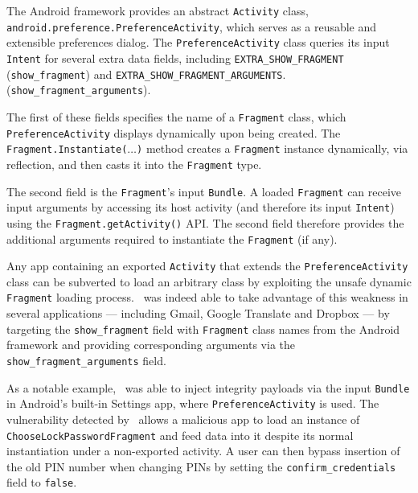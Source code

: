 The Android framework provides an abstract {\tt Activity} class,\texttt{
android.preference.PreferenceActivity}, which serves as a reusable and extensible preferences dialog. 
The {\tt PreferenceActivity} class queries its input {\tt Intent} for several extra data fields, including \texttt{EXTRA\_SHOW\_FRAGMENT}
(\texttt{show\_fragment}) 
and \texttt{EXTRA\_SHOW\_FRAGMENT\_ARGUMENTS}.
(\texttt{show\_fragment\_arguments}).

The first of these fields specifies the name 
of a \texttt{Fragment} class, which \texttt{PreferenceActivity}
displays dynamically upon being created. The {\tt Fragment.Instantiate($\ldots$)} method creates a {\tt Fragment} instance dynamically, via reflection, and then
casts it into the {\tt Fragment} type.

The second field is the \texttt{Fragment}'s input {\tt Bundle}. A loaded \texttt{Fragment} can
receive input arguments by accessing its host activity (and therefore
its input \texttt{Intent}) using the \texttt{Fragment.getActivity()} API. The second field therefore provides the additional arguments required to instantiate the {\tt Fragment} (if any).

Any app containing an exported {\tt Activity} that extends the {\tt PreferenceActivity} class can be subverted to load an arbitrary class
by exploiting the unsafe dynamic {\tt Fragment} loading process. \Tool\ was indeed able to take advantage of this weakness
in several applications --- including Gmail, Google Translate and Dropbox --- by
targeting the \texttt{show\_fragment}  field with {\tt Fragment} class names from the Android framework and providing corresponding arguments via the \texttt{show\_fragment\_arguments} field. 


As a notable example, \Tool\ was able to inject integrity payloads via the input {\tt Bundle} in Android's built-in Settings app, where {\tt PreferenceActivity} is used. 
The vulnerability detected by \Tool\ allows a malicious app to load an instance of \texttt{ChooseLockPasswordFragment}
and feed data into it despite its normal instantiation under a non-exported
activity. A user can then bypass insertion of the old PIN number when changing PINs by setting the \texttt{confirm\_credentials} field to \texttt{false}.

